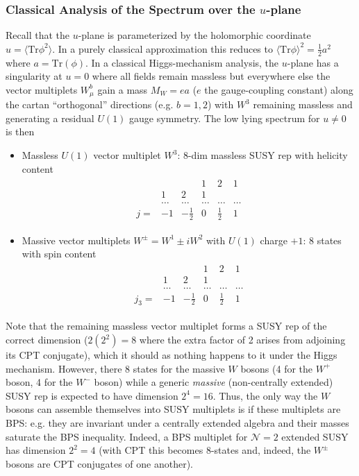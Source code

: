 \documentclass[12pt, onecolumn]{article}
\begin{document}
\subsubsection{Classical Analysis of the Spectrum over the $u$-plane}
Recall that the $u$-plane is parameterized by the holomorphic coordinate $u=\langle \text{Tr} \phi^2 \rangle$.  In a purely classical approximation this reduces to $\langle \text{Tr} \phi \rangle^2 = \frac{1}{2}a^2$ where $a = \text{Tr}(\phi)$.  In a classical Higgs-mechanism analysis, the $u$-plane has a singularity at $u=0$ where all fields remain massless but everywhere else the vector multiplets $W^{b}_{\mu}$ gain a mass $M_{W}=ea$ ($e$ the gauge-coupling constant) along the cartan ``orthogonal'' directions (e.g. $b=1,2$) with $W^{3}$ remaining massless and generating a residual $U(1)$ gauge symmetry.  The low lying spectrum for $u \neq 0$ is then
\begin{itemize}
\item Massless $U(1)$ vector multiplet $W^{3}$: 8-dim massless SUSY rep with helicity content
\begin{align*}
\begin{array}{cccccc}
{} & {} & {} & 1 & 2 & 1\\
{} & 1 & 2 & 1 & {} & {}\\
{} & \ldots & \ldots & \ldots & \ldots & \ldots\\
j= & -1 & -\frac{1}{2} & 0 & \frac{1}{2} & 1
\end{array}
\end{align*}
\item Massive vector multiplets $W^{\pm}=W^{1} \pm i W^{2}$ with $U(1)$ charge $+1$: 8 states with spin content
\begin{align*}
\begin{array}{cccccc}
{} & {} & {} & 1 & 2 & 1\\
{} & 1 & 2 & 1 & {} & {}\\
{} & \ldots & \ldots & \ldots & \ldots & \ldots\\
j_{3}= & -1 & -\frac{1}{2} & 0 & \frac{1}{2} & 1
\end{array}
\end{align*}
\end{itemize}
Note that the remaining massless vector multiplet forms a SUSY rep of the correct dimension ($2(2^{2})=8$ where the extra factor of 2 arises from adjoining its CPT conjugate), which it should as nothing happens to it under the Higgs mechanism.  However, there $8$ states for the massive $W$ bosons (4 for the $W^{+}$ boson, 4 for the $W^{-}$ boson) while a generic \textit{massive} (non-centrally extended) SUSY rep is expected to have dimension $2^{4}=16$.  Thus, the only way the $W$ bosons can assemble themselves into SUSY multiplets is if these multiplets are BPS: e.g. they are invariant under a centrally extended algebra and their masses saturate the BPS inequality.  Indeed, a BPS multiplet for $\mathcal{N}=2$ extended SUSY has dimension $2^{2}=4$ (with CPT this becomes $8$-states and, indeed, the $W^{\pm}$ bosons are CPT conjugates of one another).
\end{document}
